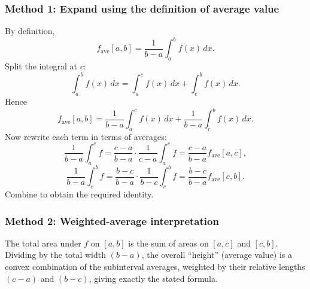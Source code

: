 \documentclass[12pt]{article}
\begin{document}
\subsubsection*{Method 1: Expand using the definition of average value}

By definition,
\[
f_{\text{ave}}[a,b]=\frac{1}{b-a}\int_a^b f(x)\,dx.
\]
Split the integral at \(c\):
\[
\int_a^b f(x)\,dx=\int_a^c f(x)\,dx+\int_c^b f(x)\,dx.
\]
Hence
\[
f_{\text{ave}}[a,b]=\frac{1}{b-a}\int_a^c f(x)\,dx+\frac{1}{b-a}\int_c^b f(x)\,dx.
\]
Now rewrite each term in terms of averages:
\[
\frac{1}{b-a}\int_a^c f
=\frac{c-a}{b-a}\cdot \frac{1}{c-a}\int_a^c f
=\frac{c-a}{b-a} f_{\text{ave}}[a,c],
\]
\[
\frac{1}{b-a}\int_c^b f
=\frac{b-c}{b-a}\cdot \frac{1}{b-c}\int_c^b f
=\frac{b-c}{b-a} f_{\text{ave}}[c,b].
\]
Combine to obtain the required identity.

\subsubsection*{Method 2: Weighted-average interpretation}

The total area under \(f\) on \([a,b]\) is the sum of areas on \([a,c]\) and \([c,b]\). Dividing by the total width \((b-a)\), the overall ``height'' (average value) is a convex combination of the subinterval averages, weighted by their relative lengths \((c-a)\) and \((b-c)\), giving exactly the stated formula.
\end{document}
